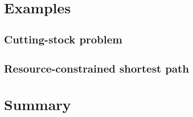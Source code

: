 \documentclass[letterpaper, 10pt, twocolumn, reqno]{amsart}
\begin{document}
\section{Examples}
\label{sec:examples}

\subsection{Cutting-stock problem}
\label{ssec:eg_cutting_stock}

\subsection{Resource-constrained shortest path}
\label{ssec:eg_shortest_path}


\section{Summary}
\label{sec:summary}


{
\small


}
\end{document}
